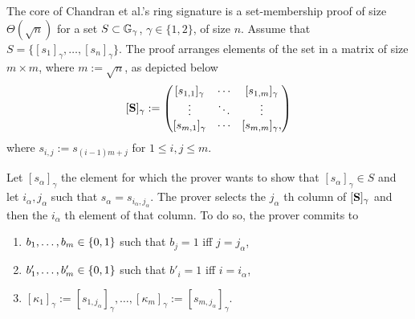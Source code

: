
The core of Chandran et al.'s ring signature is a set-membership proof of size $\Theta(\sqrt{n})$ for a set $S\subset\mathbb{G}_\gamma$, $\gamma\in\{1,2\}$, of size $n$. 
Assume that $S = \{[s_1]_\gamma,\ldots,[s_n]_\gamma\}$.
The proof arranges elements of the set in a matrix of size $m\times m$, where $m:=\sqrt{n}$, as depicted below
$$
[\mathbf{{S}}]_\gamma:=
\begin{pmatrix}
[s_{1,1}]_\gamma & \cdots & [s_{1,m}]_\gamma\\
\vdots     & \ddots & \vdots \\
[s_{m,1}]_\gamma  & \cdots & [s_{m,m}]_\gamma,
\end{pmatrix}
$$
where $s_{i,j}:=s_{(i-1)m+j}$ for $1\leq i,j \leq m$.

Let $[s_\alpha]_\gamma$ the element for which the prover wants to show that $[s_\alpha]_\gamma\in S$ and let $i_\alpha,j_\alpha$ such that $s_\alpha = s_{i_\alpha,j_\alpha}$. The prover selects the $j_\alpha$ th column of $[\mathbf{{S}}]_\gamma$ and then the $i_\alpha$ th element of that column. To do so, the prover commits to 
\begin{enumerate}
\item $b_1,\ldots,b_m\in\{0,1\}$ such that $b_j=1$ iff $j=j_\alpha$,
\item $b'_1,\ldots,b'_m\in\{0,1\}$ such that $b'_i=1$ iff $i=i_\alpha$,
\item $[\kappa_1]_\gamma:=[s_{1,j_\alpha}]_\gamma,\ldots,[\kappa_m]_\gamma:=[s_{m,j_\alpha}]_\gamma$.
\end{enumerate}

